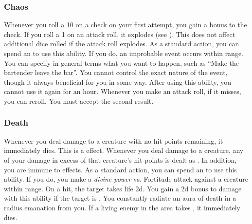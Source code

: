         \subsubsection{Chaos}
             Whenever you roll a 10 on a check on your first attempt, you gain a  bonus to the check.
             If you roll a 1 on an attack roll, it explodes (see ).
            This does not affect additional dice rolled if the attack roll explodes.
             As a standard action, you can spend an  to use this ability.
            If you do, an improbable event occurs within \rnglong range.
            You can specify in general terms what you want to happen, such as ``Make the bartender leave the bar''.
            You cannot control the exact nature of the event, though it always beneficial for you in some way.
            After using this ability, you cannot use it again for an hour.
             Whenever you make an attack roll, if it misses, you can reroll.
            You must accept the second result.

        \subsubsection{Death}
             Whenever you deal damage to a creature with no hit points remaining, it immediately dies.
            This is a  effect.
             Whenever you deal damage to a creature, any of your damage in excess of that creature's hit points is dealt as .
            In addition, you are immune to  effects.
             As a standard action, you can spend an  to use this ability.
            If you do, you make a \textit{divine power} vs. Fortitude attack against a creature within \rngmed range.
            On a hit, the target takes life  \plus2d.
            You gain a \plus2d bonus to damage with this ability if the target is .
             You constantly radiate an aura of death in a \areahuge radius emanation from you.
            If a living enemy in the area takes , it immediately dies.

